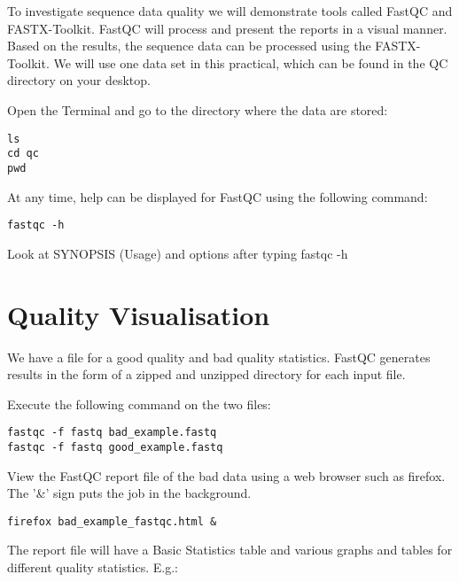 \begin{information}
To investigate sequence data quality we will demonstrate tools called FastQC
and FASTX-Toolkit. FastQC will process and present the reports in a visual manner.
Based on the results, the sequence data can be processed using the FASTX-Toolkit.
We will use one data set in this practical, which can be found in the QC
directory on your desktop.
\end{information}

\begin{steps}
Open the Terminal and go to the directory where the data are stored:
\begin{lstlisting}
ls
cd qc
pwd
\end{lstlisting}

At any time, help can be displayed for FastQC using the following command:
\begin{lstlisting}
fastqc -h
\end{lstlisting}

Look at SYNOPSIS (Usage) and options after typing fastqc -h 

\end{steps}

\section{Quality Visualisation}

\begin{information}
We have a file for a good quality and bad quality statistics. FastQC generates
results in the form of a zipped and unzipped directory for each input file.
\end{information}

\begin{steps}
Execute the following command on the two files:
\begin{lstlisting}
fastqc -f fastq bad_example.fastq 
fastqc -f fastq good_example.fastq
\end{lstlisting}

View the FastQC report file of the bad data using a web browser such as
firefox. The '\&' sign puts the job in the background.

\begin{lstlisting}
firefox bad_example_fastqc.html &
\end{lstlisting}

\end{steps}

\begin{note}
The report file will have a Basic Statistics table and various graphs and tables
for different quality statistics. E.g.:
\end{note}

